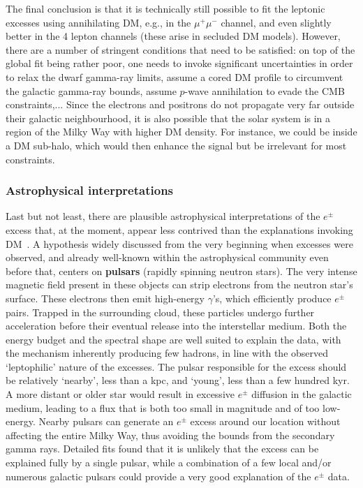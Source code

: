 The final conclusion is that it is technically still possible to fit the leptonic excesses using annihilating DM, e.g., in the $\mu^+\mu^-$ channel, and even slightly better in the 4 lepton channels (these arise in secluded DM models). However, there are a number of stringent conditions that need to be satisfied: on top of the global fit being rather poor, one needs to invoke significant uncertainties in order to relax the dwarf gamma-ray limits, assume a cored DM profile to circumvent the galactic gamma-ray bounds, assume $p$-wave annihilation to evade the CMB constraints,... 
Since the electrons and positrons do not propagate very far outside their galactic neighbourhood, it is also possible that the solar system is in a region of the Milky Way with higher DM density. For instance, we could be inside a DM sub-halo, which would then enhance the signal but be irrelevant for most constraints. 


\subsubsection*{Astrophysical interpretations}
Last but not least, there are plausible astrophysical interpretations of the $e^\pm$ excess that, at the moment, appear less contrived than the explanations invoking DM~\cite{positronexcessastro}. 
A hypothesis widely discussed from the very beginning when excesses were observed, and already well-known within the astrophysical community even before that, centers on {\bf pulsars} (rapidly spinning neutron stars).
The very intense magnetic field present in these objects can strip electrons from the neutron star's surface. These electrons then emit high-energy $\gamma$'s, which efficiently produce $e^\pm$ pairs. 
 Trapped in the surrounding cloud, these particles undergo further acceleration before their eventual release into the interstellar medium. 
Both the energy budget and the spectral shape are well suited to explain the data, with the mechanism inherently producing few hadrons, in line with the observed `leptophilic' nature of the excesses. 
The pulsar responsible for the excess should be relatively `nearby', less than a kpc, and `young', less than a few hundred kyr. 
A more distant or older star would result in excessive $e^\pm$ diffusion in the galactic medium, leading to
a flux that is both too small in magnitude and of too low-energy. 
Nearby pulsars can generate an $e^\pm$ excess around our location without affecting the entire Milky Way, thus avoiding the bounds from the secondary gamma rays.
Detailed fits found that it is unlikely that the excess can be explained fully by a single pulsar, 
while a combination of a few local and/or numerous galactic pulsars could provide a very good explanation of the $e^\pm$ data.  

